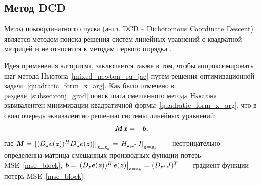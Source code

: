\subsection{Метод DCD} \label{subsec:dcd}
Метод покоординатного спуска (англ. DCD -- Dichotomous Coordinate Descent) является методом поиска решения систем линейных уравнений с квадратной матрицей и не относится к методам первого порядка \cite{dcd_alg_thesis}. 

Идея применения алгоритма, заключается также в том, чтобы аппроксимировать шаг метода Ньютона~\eqref{mixed_newton_eq_jac} путем решения оптимизационной задачи~\eqref{quadratic_form_x_arg}. Как было отмечено в разделе~\ref{subsec:conj_grad} поиск шага смешанного метода Ньютона эквивалентен минимизации квадратичной формы~\eqref{quadratic_form_x_arg}, что в свою очередь эквивалентно решению системы линейных уравнений:
\begin{equation}
	\textbf{\textit{M}}\textbf{\textit{x}}=-\textbf{\textit{b}},
	\label{system_of_lin_eq}
\end{equation}
где $\textbf{\textit{M}}=\left. [(D_{\textbf{\textit{z}}}\textbf{\textit{e}}(\textbf{\textit{z}}))^HD_{\textbf{\textit{z}}}\textbf{\textit{e}}(\textbf{\textit{z}})]\right|_{\textbf{\textit{z}}=\textbf{\textit{z}}_k}=\left. H_{\textbf{\textit{z}}, \textbf{\textit{z}}^*}J\right|_{\textbf{\textit{z}}=\textbf{\textit{z}}_k}$~---~неотрицательно определенна матрица смешанных производных функции потерь MSE~\eqref{mse_block}, $\textbf{\textit{b}}=\left. (D_{\textbf{\textit{z}}}\textbf{\textit{e}}(\textbf{\textit{z}}))^H\textbf{\textit{e}}(\textbf{\textit{z}}) \right|_{\textbf{\textit{z}}=\textbf{\textit{z}}_k}=(D_{\textbf{\textit{z}}^*}J)^T$~---~градиент функции потерь MSE~\eqref{mse_block}.

